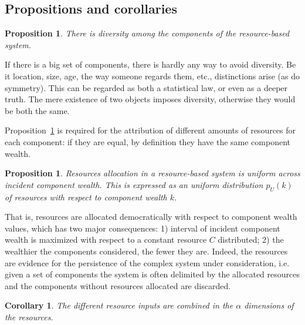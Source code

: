 \documentclass[a4paper, 11pt]{article} %
\newtheorem{proposition}[theorem]{Proposition}
\newtheorem{corollary}[theorem2]{Corollary}
\begin{document}
\subsection{Propositions and corollaries}

\setcounter{theorem}{-1}
\begin{proposition}\label{prop:0}
	There is diversity among the components of the resource-based system.
\end{proposition}

If there is a big set of components, there is hardly any way to avoid diversity. Be it location, size, age, the way someone regards them, etc., distinctions arise (as do symmetry). This can be regarded as both a statistical law, or even as a deeper truth.
The mere existence of two objects imposes diversity,
otherwise they would be both the same.

Proposition~\ref{prop:0} is required for the attribution of different amounts of resources for each component:
if they are equal, by definition they have the same component wealth.

\begin{proposition}\label{prop:2}
	Resources allocation in a resource-based system is uniform across
	incident component wealth. 
	This is expressed as an uniform distribution $p_U(k)$ 
	of resources with respect to component wealth $k$.
\end{proposition}

That is, resources are allocated democratically with respect to component wealth values, which has two major consequences: 1) interval of incident component wealth is maximized with respect to a constant resource $C$ distributed; 
2) the wealthier the components considered, the fewer they are. 
Indeed, the resources are evidence for the persistence of the complex system under consideration,
i.e. given a set of components the system is often delimited by the allocated resources
and the components without resources allocated are discarded.

\begin{corollary}\label{prop:1}
	The different resource inputs are combined in the $\alpha$ dimensions of the resources.
\end{corollary}
\end{document}
